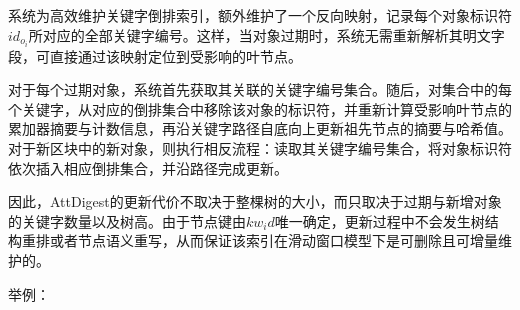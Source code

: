 系统为高效维护关键字倒排索引，额外维护了一个反向映射，记录每个对象标识符$id_{o_i}$所对应的全部关键字编号。这样，当对象过期时，系统无需重新解析其明文字段，可直接通过该映射定位到受影响的叶节点。

对于每个过期对象，系统首先获取其关联的关键字编号集合。随后，对集合中的每个关键字，从对应的倒排集合中移除该对象的标识符，并重新计算受影响叶节点的累加器摘要与计数信息，再沿关键字路径自底向上更新祖先节点的摘要与哈希值。对于新区块中的新对象，则执行相反流程：读取其关键字编号集合，将对象标识符依次插入相应倒排集合，并沿路径完成更新。

因此，AttDigest的更新代价不取决于整棵树的大小，而只取决于过期与新增对象的关键字数量以及树高。由于节点键由$kw_id$唯一确定，更新过程中不会发生树结构重排或者节点语义重写，从而保证该索引在滑动窗口模型下是可删除且可增量维护的。

举例：